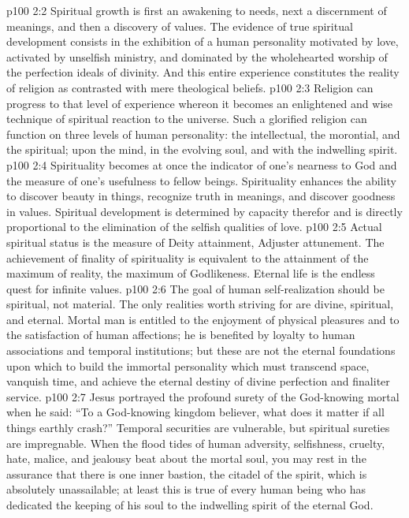 \vs p100 2:2 Spiritual growth is first an awakening to needs, next a discernment of meanings, and then a discovery of values. The evidence of true spiritual development consists in the exhibition of a human personality motivated by love, activated by unselfish ministry, and dominated by the wholehearted worship of the perfection ideals of divinity. And this entire experience constitutes the reality of religion as contrasted with mere theological beliefs.
\vs p100 2:3 Religion can progress to that level of experience whereon it becomes an enlightened and wise technique of spiritual reaction to the universe. Such a glorified religion can function on three levels of human personality: the intellectual, the morontial, and the spiritual; upon the mind, in the evolving soul, and with the indwelling spirit.
\vs p100 2:4 \pc Spirituality becomes at once the indicator of one’s nearness to God and the measure of one’s usefulness to fellow beings. Spirituality enhances the ability to discover beauty in things, recognize truth in meanings, and discover goodness in values. Spiritual development is determined by capacity therefor and is directly proportional to the elimination of the selfish qualities of love.
\vs p100 2:5 Actual spiritual status is the measure of Deity attainment, Adjuster attunement. The achievement of finality of spirituality is equivalent to the attainment of the maximum of reality, the maximum of Godlikeness. Eternal life is the endless quest for infinite values.
\vs p100 2:6 \pc The goal of human self\hyp{}realization should be spiritual, not material. The only realities worth striving for are divine, spiritual, and eternal. Mortal man is entitled to the enjoyment of physical pleasures and to the satisfaction of human affections; he is benefited by loyalty to human associations and temporal institutions; but these are not the eternal foundations upon which to build the immortal personality which must transcend space, vanquish time, and achieve the eternal destiny of divine perfection and finaliter service.
\vs p100 2:7 Jesus portrayed the profound surety of the God\hyp{}knowing mortal when he said: \textcolor{ubdarkred}{“To a God\hyp{}knowing kingdom believer, what does it matter if all things earthly crash?”} Temporal securities are vulnerable, but spiritual sureties are impregnable. When the flood tides of human adversity, selfishness, cruelty, hate, malice, and jealousy beat about the mortal soul, you may rest in the assurance that there is one inner bastion, the citadel of the spirit, which is absolutely unassailable; at least this is true of every human being who has dedicated the keeping of his soul to the indwelling spirit of the eternal God.
